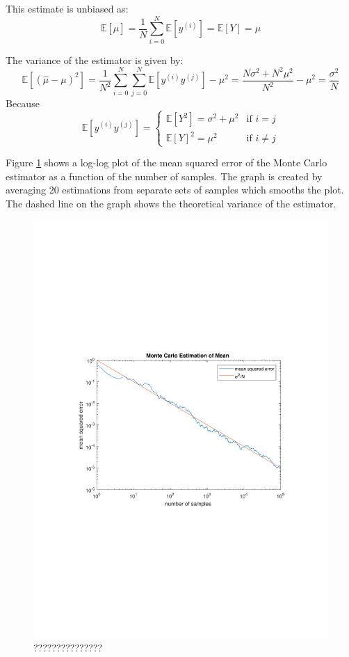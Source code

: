 \documentclass[12pt]{article}
\begin{document}
This estimate is unbiased as:
\begin{equation}
	\mathbb{E}   [\hat{\mu}] = \frac 1 N \sum ^ N _ {i=0} \mathbb{E} [y^{(i)}] = \mathbb{E} [Y] = \mu
\end{equation}

The variance of the estimator is given by:
\begin{equation}
	\mathbb{E} [(\hat{\mu} - \mu)^2] =
    \frac 1 {N^2} \sum ^ N _ {i=0} \sum ^ N _ {j = 0} \mathbb{E} [y^{(i)}y^{(j)}] - \mu^2 =
   \frac {N\sigma^2 + N^2\mu^2} {N^2} - \mu^2 = 
   \frac {\sigma^2} N
\end{equation}
Because 
\begin{equation*}
  \mathbb{E} [y^{(i)}y^{(j)}]  = 
  \begin{cases} 
      \mathbb{E} [Y^2] = \sigma^2  +\mu^2 & \mbox{if } i = j \\
      \mathbb E [Y]^2 = \mu^2 & \mbox{if } i \ne j  	
  \end{cases}
\end{equation*}

Figure \ref{fig:mote-mean} shows a log-log plot of the mean squared error of the Monte Carlo estimator as a function of the number of samples.
The graph is created by averaging 20 estimations from separate sets of samples which smooths the plot.
The dashed line on the graph shows the theoretical variance of the estimator.

\begin{figure}[htb]
\includegraphics[width=\textwidth]{figures/mote-carlo-mean-estimator.pdf}
  \caption{???????????????}
  \label{fig:mote-mean}
\end{figure}
\end{document}
